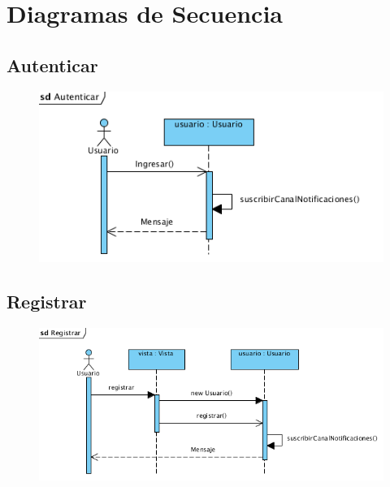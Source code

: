 \section{Diagramas de Secuencia}

\subsection{Autenticar}
\begin{figure}[H]
  \centering
    \includegraphics{imagenes/disenio/secuencia-autenticar.png}
    \label{fig:diagrama-secuencia-autenticar}
\end{figure}


\subsection{Registrar}
\begin{figure}[H]
  \centering
    \includegraphics{imagenes/disenio/secuencia-registrar.png}
    \label{fig:diagrama-secuencia-registrar}
\end{figure}

